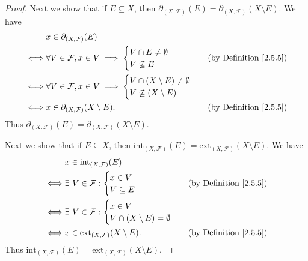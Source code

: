 \begin{proof}
    Next we show that if \(E \subseteq X\), then \(\partial_{(X, \mathcal{F})}(E) = \partial_{(X, \mathcal{F})}(X \setminus E)\).
    We have
    \begin{align*}
             & x \in \partial_{(X, \mathcal{F})}(E)                                                           \\
        \iff & \forall V \in \mathcal{F}, x \in V \implies \begin{cases}
                                                               V \cap E \neq \emptyset \\
                                                               V \not\subseteq E
                                                           \end{cases} & \text{(by Definition \ref{2.5.5})}   \\
        \iff & \forall V \in \mathcal{F}, x \in V \implies \begin{cases}
                                                               V \cap (X \setminus E) \neq \emptyset \\
                                                               V \not\subseteq (X \setminus E)
                                                           \end{cases}              \\
        \iff & x \in \partial_{(X, \mathcal{F})}(X \setminus E).         & \text{(by Definition \ref{2.5.5})}
    \end{align*}
    Thus \(\partial_{(X, \mathcal{F})}(E) = \partial_{(X, \mathcal{F})}(X \setminus E)\).

    Next we show that if \(E \subseteq X\), then \(\text{int}_{(X, \mathcal{F})}(E) = \text{ext}_{(X, \mathcal{F})}(X \setminus E)\).
    We have
    \begin{align*}
             & x \in \text{int}_{(X, \mathcal{F})}(E)                                                   \\
        \iff & \exists\ V \in \mathcal{F} : \begin{cases}
                                                x \in V \\
                                                V \subseteq E
                                            \end{cases}          & \text{(by Definition \ref{2.5.5})}   \\
        \iff & \exists\ V \in \mathcal{F} : \begin{cases}
                                                x \in V \\
                                                V \cap (X \setminus E) = \emptyset
                                            \end{cases}                           \\
        \iff & x \in \text{ext}_{(X, \mathcal{F})}(X \setminus E). & \text{(by Definition \ref{2.5.5})}
    \end{align*}
    Thus \(\text{int}_{(X, \mathcal{F})}(E) = \text{ext}_{(X, \mathcal{F})}(X \setminus E)\).


\end{proof}
